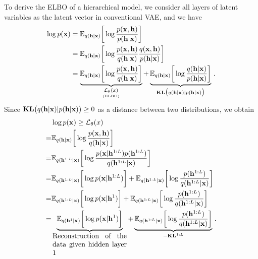 \documentclass[twoside]{article}
\begin{document}
To derive the ELBO of a hierarchical model, we consider all  layers of latent variables as the latent vector in conventional VAE, and we have 
\begin{align*}
\log p(\mathbf{x}) &=  \mathbb{E}_{q(\mathbf{h} | \mathbf{x})} \bigg[ \log  \frac{p(\mathbf{x}, \mathbf{h})}{p(\mathbf{h}|\mathbf{x})} \bigg] \\
&=  \mathbb{E}_{q(\mathbf{h} | \mathbf{x})} \bigg[ \log  \frac{p(\mathbf{x}, \mathbf{h})}{q(\mathbf{h}|\mathbf{x})}   \frac{q(\mathbf{x}, \mathbf{h})}{p(\mathbf{h}|\mathbf{x})} \bigg] \\
&=  \underbrace{\mathbb{E}_{q(\mathbf{h} | \mathbf{x})} \bigg[ \log  \frac{p(\mathbf{x}, \mathbf{h})}{q(\mathbf{h}|\mathbf{x})}  \bigg]}_{\underset{\text{(ELBO)}}{\mathcal{L}_{\theta}(x)}} +   \underbrace{\mathbb{E}_{q(\mathbf{h} | \mathbf{x})} \bigg[ \log \frac{q(\mathbf{h} |\mathbf{x})}{p(\mathbf{h}|\mathbf{x})} \bigg]}_{\textbf{\text{KL}}\big(q(\mathbf{h} |\mathbf{x}) | p(\mathbf{h}|\mathbf{x})\big)} \, .
\end{align*}
Since $\textbf{\text{KL}}\big(q(\mathbf{h} |\mathbf{x}) | p(\mathbf{h}|\mathbf{x})\big) \geq 0$ as a distance between two distributions, we obtain
\begin{align}  \label{eq:tree_elbo}
&\log p(\mathbf{x})  \geq  \mathcal{L}_{\theta}(x) \\  \notag
=&  \mathbb{E}_{q(\mathbf{h} | \mathbf{x})} \bigg[ \log  \frac{p(\mathbf{x}, \mathbf{h})}{q(\mathbf{h}|\mathbf{x})}  \bigg]  \\  \notag
=&  \mathbb{E}_{q(\mathbf{h}^{1:L} | \mathbf{x})} \bigg[ \log  \frac{p(\mathbf{x} | \mathbf{h}^{1:L}) p( \mathbf{h}^{1:L})}{q(\mathbf{h}^{1:L}|\mathbf{x})}  \bigg]  \\   \notag
 =&  \mathbb{E}_{q(\mathbf{h}^{1:L} | \mathbf{x})} \bigg[  \log p(\mathbf{x} | \mathbf{h}^{1:L})  \bigg]  +  \mathbb{E}_{q(\mathbf{h}^{1:L} | \mathbf{x})} \bigg[ \log   \frac{p( \mathbf{h}^{1:L})}{q(\mathbf{h}^{1:L}|\mathbf{x})}  \bigg]   \\    \label{eq:layer0_a}
=&  \mathbb{E}_{q(\mathbf{h}^{1:L} | \mathbf{x})} \bigg[ \log p(\mathbf{x} | \mathbf{h}^{1})  \bigg]  +  \mathbb{E}_{q(\mathbf{h}^{1:L} | \mathbf{x})} \bigg[ \log     \frac{p( \mathbf{h}^{1:L})}{q(\mathbf{h}^{1:L}|\mathbf{x})}  \bigg]  \\ 
=&  \underbrace{ \mathbb{E}_{q(\mathbf{h}^{1} | \mathbf{x})} \bigg[ \log  p(\mathbf{x} | \mathbf{h}^{1})  \bigg] }_{  \parbox{10.5em}{Reconstruction of the data given hidden layer 1}}  +  \underbrace{  \mathbb{E}_{q(\mathbf{h}^{1:L} | \mathbf{x})} \bigg[ \log  \frac{p( \mathbf{h}^{1:L})}{q(\mathbf{h}^{1:L}|\mathbf{x})}  \bigg] }_{-\textbf{\text{KL}}^{1:L}} \, .     \label{eq:layer0_b}
\end{align}
\end{document}
